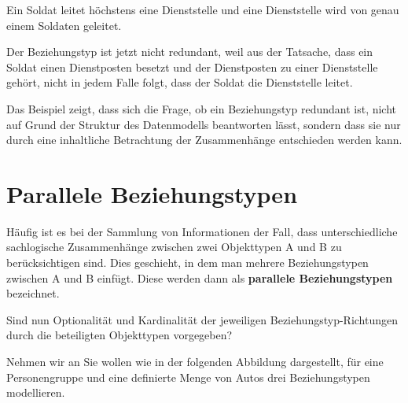          Ein Soldat leitet höchstens eine Dienststelle und eine Dienststelle wird von genau einem Soldaten geleitet.
          \begin{center}
          \end{center}
          Der Beziehungstyp ist jetzt nicht redundant, weil aus der Tatsache, dass ein Soldat einen Dienstposten besetzt und der Dienstposten zu einer Dienststelle gehört, nicht in jedem Falle folgt, dass der Soldat die Dienststelle leitet.

          Das Beispiel zeigt, dass sich die Frage, ob ein Beziehungstyp redundant ist, nicht auf Grund der Struktur des Datenmodells beantworten lässt, sondern dass sie nur durch eine inhaltliche Betrachtung der Zusammenhänge entschieden werden kann.
      \section{Parallele Beziehungstypen}
        Häufig ist es bei der Sammlung von Informationen der Fall, dass unterschiedliche sachlogische Zusammenhänge zwischen zwei Objekttypen A und B zu berücksichtigen sind. Dies geschieht, in dem man mehrere Beziehungstypen zwischen A und B einfügt. Diese werden dann als \textbf{parallele Beziehungstypen} bezeichnet.

        Sind nun Optionalität und Kardinalität der jeweiligen Beziehungstyp-Richtungen durch die beteiligten Objekttypen vorgegeben?

        Nehmen wir an Sie wollen wie in der folgenden Abbildung dargestellt, für eine Personengruppe und eine definierte Menge von Autos drei Beziehungstypen modellieren.

